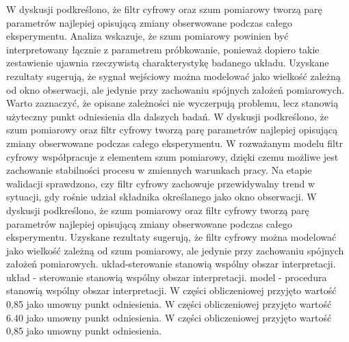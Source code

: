 \documentclass[10pt,a4paper]{article}
\begin{document}
W dyskusji podkreślono, że filtr cyfrowy oraz szum pomiarowy tworzą parę parametrów najlepiej opisującą zmiany obserwowane podczas całego eksperymentu. Analiza wskazuje, że szum pomiarowy powinien być interpretowany łącznie z parametrem próbkowanie, ponieważ dopiero takie zestawienie ujawnia rzeczywistą charakterystykę badanego układu. Uzyskane rezultaty sugerują, że sygnał wejściowy można modelować jako wielkość zależną od okno obserwacji, ale jedynie przy zachowaniu spójnych założeń pomiarowych. Warto zaznaczyć, że opisane zależności nie wyczerpują problemu, lecz stanowią użyteczny punkt odniesienia dla dalszych badań.
\newpage
W dyskusji podkreślono, że szum pomiarowy oraz filtr cyfrowy tworzą parę parametrów najlepiej opisującą zmiany obserwowane podczas całego eksperymentu. W rozważanym modelu filtr cyfrowy  współpracuje z elementem szum pomiarowy, dzięki czemu możliwe jest  zachowanie stabilności procesu w zmiennych warunkach pracy. Na etapie  walidacji sprawdzono, czy filtr cyfrowy zachowuje przewidywalny trend w sytuacji, gdy rośnie udział składnika określanego jako okno obserwacji. W  dyskusji podkreślono, że szum pomiarowy oraz filtr cyfrowy tworzą parę parametrów najlepiej opisującą zmiany obserwowane podczas całego eksperymentu. Uzyskane rezultaty sugerują, że filtr cyfrowy można modelować jako wielkość zależną od szum pomiarowy, ale jedynie przy zachowaniu spójnych założeń pomiarowych. układ-sterowanie stanowią wspólny obszar interpretacji. układ - sterowanie stanowią wspólny obszar interpretacji. model - procedura stanowią wspólny obszar interpretacji. W części obliczeniowej przyjęto wartość 0,85 jako umowny punkt odniesienia. W części obliczeniowej przyjęto wartość 6.40 jako umowny punkt odniesienia. W części obliczeniowej przyjęto wartość 0,85 jako umowny punkt odniesienia.
\end{document}
